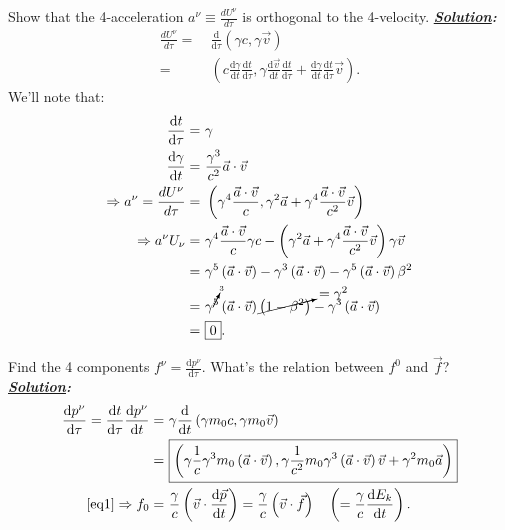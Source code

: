 \documentclass[notitlepage]{report}
\begin{document}
\begin{question}[title = Question 3.2]{}{}
	Show that the 4-acceleration $a^{\nu}\equiv \frac{dU^\nu}{d\tau}$ is orthogonal to the 4-velocity.
\tcblower
\textbf{\emph{\underline{Solution}:}}\\
\begin{align*}
	\frac{dU^\nu}{d\tau} =&\ \frac{\text{d}}{\text{d}\tau} \left(\gamma c,\gamma \vec{v}\right)\\
	 =&\ \left(c\frac{\text{d}\gamma}{\text{d}t}\frac{\text{d}t}{\text{d}\tau},\gamma\frac{\text{d}\vec{v}}{\text{d}t}\frac{\text{d}t}{\text{d}\tau}+\frac{\text{d}\gamma}{\text{d}t}\frac{\text{d}t}{\text{d}\tau}\vec{v}\right) 
.\end{align*}
\tcbbreak
We'll note that:\\
\begin{align*}
	\frac{\text{d}t}{\text{d}\tau} =&\ \gamma\\
	\frac{\text{d}\gamma}{\text{d}t} =&\ \frac{\gamma^3}{c^2}\vec{a}\cdot \vec{v}\\
	\Rightarrow a^{\nu}=\frac{dU^\nu}{d\tau} =&\ \left(\gamma^{4} \frac{\vec{a}\cdot \vec{v}}{c},\gamma^2 \vec{a}+\gamma^{4} \frac{\vec{a}\cdot \vec{v}}{c^2} \vec{v}\right)\\
	\Rightarrow a^{\nu}U_\nu =&\ \gamma^{4} \frac{\vec{a}\cdot \vec{v}}{c}\gamma c-\left(\gamma^2 \vec{a}+\gamma^{4} \frac{\vec{a}\cdot \vec{v}}{c^2} \vec{v}\right)\gamma \vec{v}\\
	 =&\ \gamma^{5}\left(\vec{a}\cdot \vec{v}\right)-\gamma^{3}\left(\vec{a}\cdot \vec{v}\right)-\gamma^{5}\left(\vec{a}\cdot \vec{v}\right)\beta^2\\
	 =&\ \gamma^{\cancelto{3}{5}}\left(\vec{a} \cdot \vec{v}\right)\cancelto{=\gamma^2}{\left(1-\beta^2\right)}-\gamma^{3}\left(\vec{a}\cdot \vec{v}\right)  \\
	  =&\ \boxed{0}
.\end{align*}
\end{question}
\begin{question}[title = Question 3.3]{}{}
Find the 4 components $f^{\nu}=\frac{\text{d}p^{\nu}}{\text{d}\tau}$. What's the relation between $f^{0}$ and $\vec{f}$?
\tcblower
\textbf{\emph{\underline{Solution}:}}\\
\begin{align*}
	\frac{\text{d}p^{\nu}}{\text{d}\tau} =\frac{\text{d}t}{\text{d}\tau}\frac{\text{d}p^{\nu}}{\text{d}t} =&\ \gamma\frac{\text{d}}{\text{d}t}\left(\gamma m_0c,\gamma m_0 \vec{v}\right)\\
	 =&\ \boxed{\left(\gamma\frac{1}{c} \gamma^3m_0\left(\vec{a} \cdot \vec{v}\right),\gamma\frac{1}{c^2}m_0\gamma^3\left(\vec{a}\cdot \vec{v}\right) \vec{v}+\gamma^2m_0 \vec{a}  \right)}\\
	 \text{\eqref{eq1}}\Rightarrow f_0=&\ \frac{\gamma}{c}\left(\vec{v}\cdot \frac{\text{d}\vec{p}}{\text{d}t} \right) = \frac{\gamma}{c}\left(\vec{v}\cdot \vec{f}\right)\quad\left(= \frac{\gamma}{c} \frac{\text{d}E_k}{\text{d}t} \right)  
.\end{align*}
\end{question}
\end{document}
